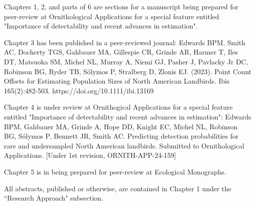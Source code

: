 \par Chapters 1, 2, and parts of 6 are sections for a manuscript being prepared for peer-review at Ornithological Applications for a special feature entitled "Importance of detectability and recent advances in estimation".

\par Chapter 3 has been published in a peer-reviewed journal:
Edwards BPM, Smith AC, Docherty TGS, Gahbauer MA, Gillespie CR, Grinde AR, Harmer T, Iles DT, Matsuoka SM, Michel NL, Murray A, Niemi GJ, Pasher J, Pavlacky Jr DC, Robinson BG, Ryder TB, Sólymos P, Stralberg D, Zlonis EJ. (2023). Point Count Offsets for Estimating Population Sizes of North American Landbirds. Ibis 165(2):482-503. https://doi.org/10.1111/ibi.13169

\par Chapter 4 is under review at Ornithogical Applications for a special feature entitled "Importance of detectability and recent advances in estimation":
Edwards BPM, Gahbauer MA, Grinde A, Hope DD, Knight EC, Michel NL, Robinson BG, Sólymos P, Bennett JR, Smith AC. Predicting detection probabilities for rare and undersampled North American landbirds. Submitted to Ornithological Applications. [Under 1st revision, ORNITH-APP-24-159]

\par Chapter 5 is in being prepared for peer-review at Ecological Monographs.

\par All abstracts, published or otherwise, are contained in Chapter 1 under the ``Research Approach" subsection.



\clearpage

\tableofcontents

\listoffigures

\listoftables


\label{endfrontmatter} %
